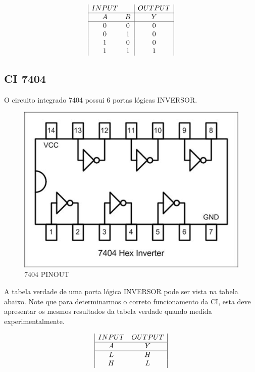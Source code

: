 \documentclass{article}
\begin{document}
\begin{displaymath}
\begin{array}{|c c|c|}
INPUT & & OUTPUT\\
\hline
A & B & Y\\
\hline %
0 & 0 & 0\\
0 & 1 & 0\\
1 & 0 & 0\\
1 & 1 & 1\\
\end{array}
\end{displaymath}

\subsection{CI 7404}
O circuito integrado 7404 possui 6 portas lógicas INVERSOR.

\begin{figure}[h!]
  \includegraphics[scale=.7]{7404}
  \caption{7404 PINOUT}
\end{figure}

A tabela verdade de uma porta lógica INVERSOR pode ser vista na tabela abaixo. Note que para determinarmos o correto funcionamento da CI, esta deve apresentar os mesmos resultados da tabela verdade quando medida experimentalmente.

\begin{displaymath}
\begin{array}{|c c|c|}
INPUT & OUTPUT\\
\hline
A & Y\\
\hline %
L & H\\
H & L\\
\end{array}
\end{displaymath}
\end{document}
